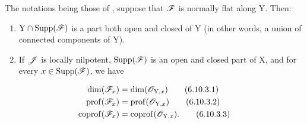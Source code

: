 \begin{proposition}[6.10.3]
\label{IV.6.10.3}
The notations being those of , suppose that $\mathscr{F}$ is normally flat along $\mathrm{Y}$. Then:
\begin{enumerate}[label=\textup{(\roman*)}]
  \item $\mathrm{Y}\cap\operatorname{Supp}(\mathscr{F})$ is a part both open and closed of $\mathrm{Y}$ \textup{(in other words, a} union of connected components of $\mathrm{Y}$).
  \item If $\mathscr{J}$ is locally nilpotent, $\operatorname{Supp}(\mathscr{F})$ is an open and closed part of $\mathrm{X}$, and for every $x\in\operatorname{Supp}(\mathscr{F})$, we have
\end{enumerate}
\begin{align}
  \dim(\mathscr{F}_x) &= \dim(\mathscr{O}_{\mathrm{Y},x}) \tag{6.10.3.1}\label{IV.6.10.3.1}\\
  \operatorname{prof}(\mathscr{F}_x) &= \operatorname{prof}(\mathscr{O}_{\mathrm{Y},x}) \tag{6.10.3.2}\label{IV.6.10.3.2}\\
  \operatorname{coprof}(\mathscr{F}_x) &= \operatorname{coprof}(\mathscr{O}_{\mathrm{Y},x}). \tag{6.10.3.3}\label{IV.6.10.3.3}
\end{align}
\end{proposition}

